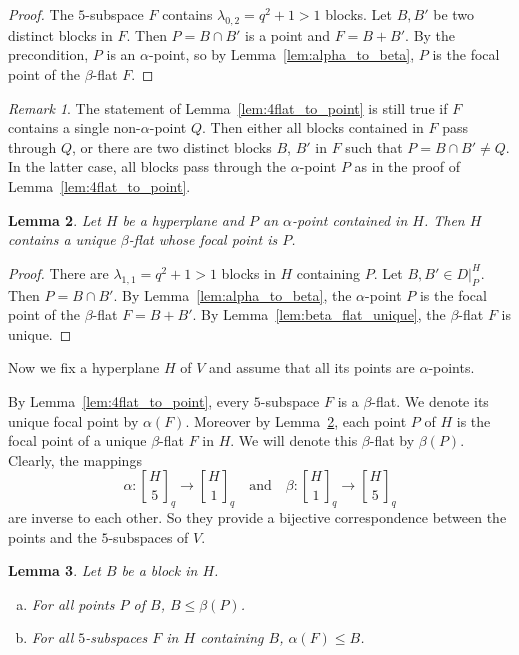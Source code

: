 \documentclass[a4paper,abstracton,12pt]{scrartcl}
\newcommand{\qbinom}[3]{\genfrac{[}{]}{0pt}{}{#1}{#2}_{#3}}
\newtheorem{lemma}{Lemma}[section]
\theoremstyle{definition}
\theoremstyle{remark}
\newtheorem{remark}[lemma]{Remark}
\begin{document}
\begin{proof}
	The $5$-subspace $F$ contains $\lambda_{0,2} = q^2 + 1 > 1$ blocks.
	Let $B, B'$ be two distinct blocks in $F$.
	Then $P = B\cap B'$ is a point and $F = B + B'$.
	By the precondition, $P$ is an $\alpha$-point, so by Lemma~\ref{lem:alpha_to_beta}, $P$ is the focal point of the $\beta$-flat $F$.
\end{proof}

\begin{remark}
	The statement of Lemma~\ref{lem:4flat_to_point} is still true if $F$ contains a single non-$\alpha$-point $Q$.
	Then either all blocks contained in $F$ pass through $Q$, or there are two distinct blocks $B$, $B'$ in $F$ such that $P = B\cap B' \neq Q$.
	In the latter case, all blocks pass through the $\alpha$-point $P$ as in the proof of Lemma~\ref{lem:4flat_to_point}.
\end{remark}

\begin{lemma}
	\label{lem:6-1-chain}
	Let $H$ be a hyperplane and $P$ an $\alpha$-point contained in $H$.
	Then $H$ contains a unique $\beta$-flat whose focal point is $P$.
\end{lemma}

\begin{proof}
	There are $\lambda_{1,1} = q^2 + 1 > 1$ blocks in $H$ containing $P$.
	Let $B,B'\in D|^H_P$.
	Then $P = B \cap B'$.
	By Lemma~\ref{lem:alpha_to_beta}, the $\alpha$-point $P$ is the focal point of the $\beta$-flat $F = B + B'$.
	By Lemma~\ref{lem:beta_flat_unique}, the $\beta$-flat $F$ is unique.
\end{proof}

Now we fix a hyperplane $H$ of $V$ and assume that all its points are $\alpha$-points.

By Lemma~\ref{lem:4flat_to_point}, every $5$-subspace $F$ is a $\beta$-flat.
We denote its unique focal point by $\alpha(F)$.
Moreover by Lemma~\ref{lem:6-1-chain}, each point $P$ of $H$ is the focal point of a unique $\beta$-flat $F$ in $H$.
We will denote this $\beta$-flat by $\beta(P)$.
Clearly, the mappings
\[
\alpha : \qbinom{H}{5}{q} \to \qbinom{H}{1}{q}
\quad\text{and}\quad
\beta : \qbinom{H}{1}{q} \to \qbinom{H}{5}{q}
\]
are inverse to each other.
So they provide a bijective correspondence between the points and the $5$-subspaces of $V$.

\begin{lemma}
	\label{lem:PBF}
	Let $B$ be a block in $H$.
	\begin{enumerate}[(a)]
		\item\label{lem:PBF:PB} For all points $P$ of $B$, $B \leq \beta(P)$.
		\item\label{lem:PBF:BF} For all $5$-subspaces $F$ in $H$ containing $B$, $\alpha(F) \leq B$.
	\end{enumerate}
\end{lemma}
\end{document}
